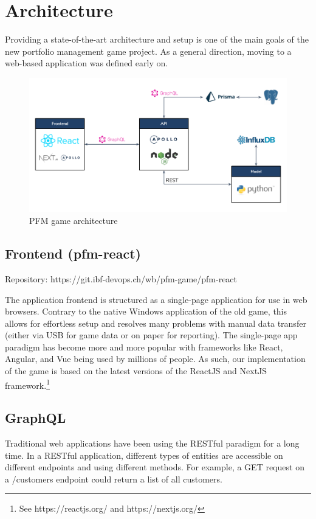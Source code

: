 \section{Architecture}
Providing a state-of-the-art architecture and setup is one of the main goals of the new portfolio management game project. As a general direction, moving to a web-based application was defined early on.

\begin{figure}[h!]
  \centering
  \includegraphics[scale=0.45]{img/architecture.png}
  \caption{PFM game architecture}
\end{figure}


\subsection{Frontend (pfm-react)}

Repository: https://git.ibf-devops.ch/wb/pfm-game/pfm-react

The application frontend is structured as a single-page application for use in web browsers. Contrary to the native Windows application of the old game, this allows for effortless setup and resolves many problems with manual data transfer (either via USB for game data or on paper for reporting). The single-page app paradigm has become more and more popular with frameworks like React, Angular, and Vue being used by millions of people. As such, our implementation of the game is based on the latest versions of the ReactJS and NextJS framework.\footnote{See https://reactjs.org/ and https://nextjs.org/}


\subsection{GraphQL}

Traditional web applications have been using the RESTful paradigm for a long time. In a RESTful application, different types of entities are accessible on different endpoints and using different methods. For example, a GET request on a /customers endpoint could return a list of all customers.

